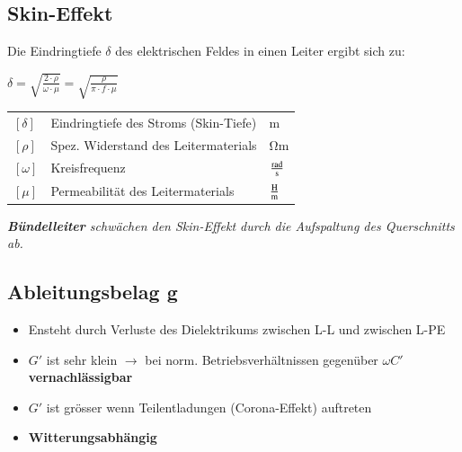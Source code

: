 \subsection{Skin-Effekt}
    Die Eindringtiefe $\delta$ des elektrischen Feldes in einen Leiter ergibt sich zu:

    \vspace{0.15cm}

    \begin{minipage}[t]{0.33\columnwidth}
        $
        \boxed{
        \delta  = \sqrt{\frac{2 \cdot \rho}{\omega \cdot \mu}}
                = \sqrt{\frac{\rho}{\pi \cdot f \cdot \mu}}
        }
        $
    \end{minipage}%
    \hfill
    \begin{minipage}[t]{0.65\columnwidth}
        \renewcommand{\arraystretch}{1.2}
        \begin{tabular}{l l l}
            $[\delta]$   & Eindringtiefe des Stroms (Skin-Tiefe) \dotfill   & $\unit{\metre}$ \\
            $[\rho]$     & Spez. Widerstand des Leitermaterials \dotfill    & $\unit{\ohm\metre}$ \\
            $[\omega]$   & Kreisfrequenz \dotfill                           & $\unit[per-mode=fraction]{\radian\per\second}$ \\
            $[\mu]$      & Permeabilität des Leitermaterials \dotfill       & $\unit[per-mode=fraction]{\henry\per\metre}$ \\
        \end{tabular}
    \end{minipage}

    \vspace{0.1cm}

    \textit{\textbf{Bündelleiter} schwächen den Skin-Effekt durch die Aufspaltung des Querschnitts ab.}



\subsection{Ableitungsbelag g}
    \begin{itemize}
        \item Ensteht durch Verluste des Dielektrikums zwischen L-L und zwischen L-PE
        \item $G'$ ist sehr klein $\rightarrow$ bei norm. Betriebsverhältnissen gegenüber $\omega C'$ \textbf{vernachlässigbar}
        \item $G'$ ist grösser wenn Teilentladungen (Corona-Effekt) auftreten
        \item \textbf{Witterungsabhängig}
    \end{itemize}

